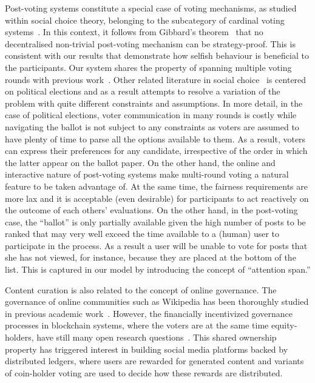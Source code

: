   Post-voting systems constitute a special case of voting mechanisms, as studied
  within social choice theory, belonging to the subcategory of cardinal voting
  systems~\cite{hillinger2005case}. In this context, it follows from Gibbard's
  theorem~\cite{gibbard1973manipulation} that no decentralised non-trivial
  post-voting mechanism can be strategy-proof. This is consistent with our
  results that demonstrate how selfish behaviour is beneficial to the
  participants. Our system shares the property of spanning multiple voting
  rounds with previous work~\cite{kalech2011practical}. Other related literature
  in social
  choice~\cite{lu2011robust,conitzer2005communication,xia2010compilation} is
  centered on political elections and as a result attempts to resolve a
  variation of the problem with quite different constraints and assumptions. In
  more detail, in the case of political elections, voter communication in many
  rounds is costly while navigating the ballot is not subject to any constraints
  as voters are assumed to have plenty of time to parse all the options
  available to them. As a result, voters can express their preferences for any
  candidate, irrespective of the order in which the latter appear on the ballot
  paper. On the other hand, the online and interactive nature of post-voting
  systems make multi-round voting a natural feature to be taken advantage of. At
  the same time, the fairness requirements are more lax and it is acceptable
  (even desirable) for participants to act reactively on the outcome of each
  others' evaluations. On the other hand, in the post-voting case, the
  ``ballot'' is only partially available given the high number of posts to be
  ranked that may very well exceed the time available to a (human) user to
  participate in the process. As a result a user will be unable to vote for
  posts that she has not viewed, for instance, because they are placed at the
  bottom of the list. This is captured in our model by introducing the concept
  of ``attention span.''

  Content curation is also related to the concept of online governance. The
  governance of online communities such as Wikipedia has been thoroughly studied
  in previous academic work~\cite{leskovec2010governance,forte2008scaling}.
  However, the financially incentivized governance processes in blockchain
  systems, where the voters are at the same time equity-holders, have still many
  open research questions~\cite{vitalik,ehrsam}. This shared ownership property
  has triggered interest in building social media platforms backed by
  distributed ledgers, where users are rewarded for generated content and
  variants of coin-holder voting are used to decide how these rewards are
  distributed.

